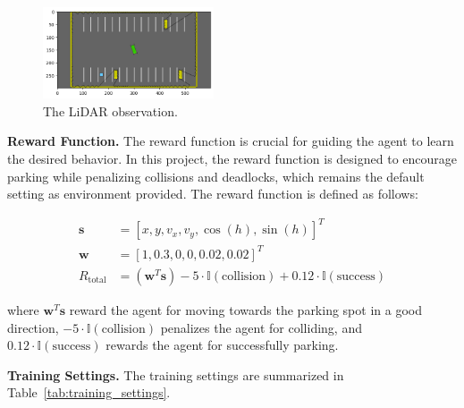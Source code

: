 \documentclass{article}
\begin{document}
\begin{figure}[h]
    \centering
    \includegraphics[width=0.45\textwidth]{./pics/lidar.png}
    \caption{The LiDAR observation.}
    \label{fig:lidar}
\end{figure}

\textbf{Reward Function.} The reward function is crucial for guiding the agent to learn the desired behavior. In this project, the reward function is designed to encourage parking while penalizing collisions and deadlocks, which remains the default setting as environment provided. The reward function is defined as follows:

\begin{align*}
    \mathbf{s} &= [x, y, v_x, v_y, \cos(h), \sin(h)]^T \\
    \mathbf{w} &= [1, 0.3, 0, 0, 0.02, 0.02]^T \\
    R_{\text{total}} &= (\mathbf{w}^T \mathbf{s}) - 5 \cdot \mathbb{I}(\text{collision}) + 0.12 \cdot \mathbb{I}(\text{success})
\end{align*}

where $\mathbf{w}^T \mathbf{s}$ reward the agent for moving towards the parking spot in a good direction, $- 5 \cdot \mathbb{I}(\text{collision})$ penalizes the agent for colliding, and $0.12 \cdot \mathbb{I}(\text{success})$ rewards the agent for successfully parking.

\textbf{Training Settings.} The training settings are summarized in Table~\ref{tab:training_settings}.
\end{document}
